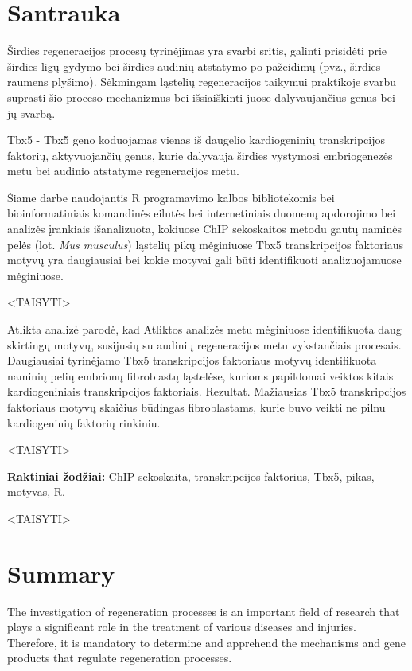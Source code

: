 \documentclass[12pt]{article}
\begin{document}
\section*{Santrauka}
Širdies regeneracijos procesų tyrinėjimas yra svarbi sritis, galinti
prisidėti prie širdies ligų  gydymo bei širdies audinių atstatymo po
pažeidimų (pvz., širdies raumens plyšimo). Sėkmingam ląstelių regeneracijos
taikymui praktikoje svarbu suprasti šio proceso mechanizmus bei išsiaiškinti
juose dalyvaujančius genus bei jų svarbą.

Tbx5 - Tbx5 geno koduojamas vienas iš daugelio kardiogeninių transkripcijos
faktorių, aktyvuojančių genus, kurie dalyvauja širdies vystymosi
embriogenezės metu bei audinio atstatyme regeneracijos metu.
                                                                                     
Šiame darbe naudojantis R programavimo kalbos bibliotekomis bei
bioinformatiniais komandinės eilutės bei internetiniais duomenų apdorojimo
bei analizės įrankiais išanalizuota, kokiuose ChIP sekoskaitos metodu gautų
naminės pelės (lot. \emph{Mus musculus}) ląstelių pikų mėginiuose Tbx5
transkripcijos faktoriaus motyvų yra daugiausiai bei kokie motyvai gali būti
identifikuoti analizuojamuose mėginiuose.

<TAISYTI>

Atlikta analizė parodė, kad 
Atliktos analizės metu mėginiuose identifikuota daug skirtingų motyvų,
susijusių su audinių regeneracijos metu vykstančiais procesais.
Daugiausiai tyrinėjamo Tbx5 transkripcijos faktoriaus motyvų identifikuota
naminių pelių embrionų fibroblastų ląstelėse, kurioms papildomai veiktos
kitais kardiogeniniais transkripcijos faktoriais. Rezultat. Mažiausias Tbx5 transkripcijos faktoriaus motyvų skaičius
būdingas fibroblastams, kurie buvo veikti ne pilnu kardiogeninių faktorių
rinkiniu.

<TAISYTI>

\hfill \break
\textbf{Raktiniai žodžiai:} ChIP sekoskaita, transkripcijos faktorius, Tbx5,
        pikas, motyvas, R.
\newpage

<TAISYTI>
\section*{Summary}
The investigation of regeneration processes is an important field of research
that plays a significant role in the treatment of various diseases and injuries.
Therefore, it is mandatory to determine and apprehend the mechanisms and gene
products that regulate regeneration processes.
\end{document}
